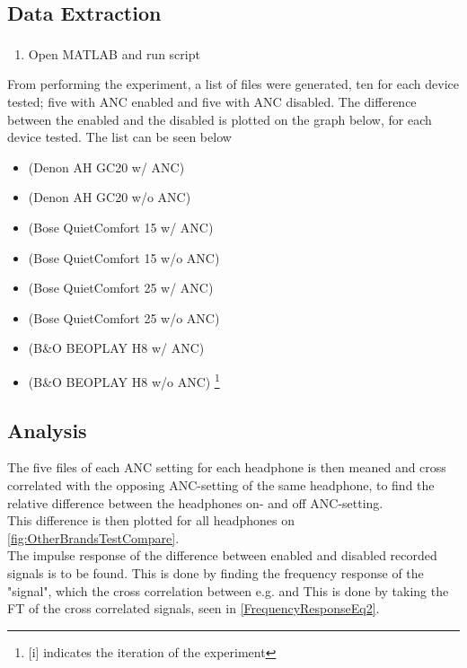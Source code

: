 		
\subsection{Data Extraction}
\begin{enumerate}
	\item Open MATLAB\textsuperscript{\textregistered} and run script 
\end{enumerate}

From performing the experiment, a list of files were generated, ten for each device tested; five with ANC enabled and five with ANC disabled.
The difference between the enabled and the disabled is plotted on the graph below, for each device tested. The list can be seen below

\begin{itemize}
	\item {}			(Denon AH GC20 w/ ANC)
	\item {}		(Denon AH GC20 w/o ANC)
	\item {}		(Bose QuietComfort 15 w/ ANC)
	\item {}		(Bose QuietComfort 15 w/o ANC)
	\item {}		(Bose QuietComfort 25 w/ ANC)
	\item {}		(Bose QuietComfort 25 w/o ANC)
	\item {}			(B\&O BEOPLAY H8 w/ ANC)
	\item {}			(B\&O BEOPLAY H8 w/o ANC)
	\footnote{[i] indicates the iteration of the experiment}
\end{itemize}


\subsection{Analysis}
The five files of each ANC setting for each headphone is then meaned and cross correlated with the opposing ANC-setting of the same headphone, to find the relative difference between the headphones on- and off ANC-setting.\\
This difference is then plotted for all headphones on \autoref{fig:OtherBrandsTestCompare}.
\\
The impulse response of the difference between enabled and disabled recorded signals is to be found.
This is done by finding the frequency response of the "signal", which the cross correlation between e.g.  and  This is done by taking the FT of the cross correlated signals, seen in \autoref{FrequencyResponseEq2}.


